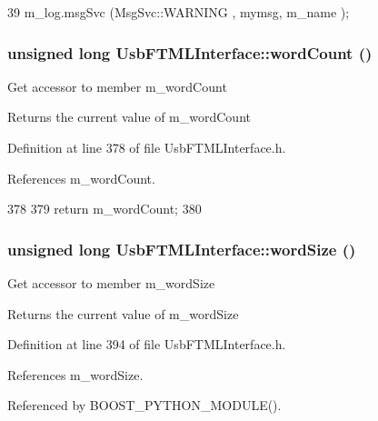 \begin{DoxyCode}
39 { m_log.msgSvc (MsgSvc::WARNING , mymsg, m_name ); }
\end{DoxyCode}
\hypertarget{classUsbFTMLInterface_a844ab72bfe0d3e14dd16f607a7c14905}{
\subsubsection[{wordCount}]{\setlength{\rightskip}{0pt plus 5cm}unsigned long UsbFTMLInterface::wordCount ()}}
\label{classUsbFTMLInterface_a844ab72bfe0d3e14dd16f607a7c14905}
Get accessor to member m\_\-wordCount \begin{DoxyReturn}{Returns}
the current value of m\_\-wordCount 
\end{DoxyReturn}


Definition at line 378 of file UsbFTMLInterface.h.

References m\_\-wordCount.


\begin{DoxyCode}
378                              {
379     return m_wordCount;
380   }
\end{DoxyCode}
\hypertarget{classUsbFTMLInterface_ac313f412cbda6222ef817cb46083e2b3}{
\subsubsection[{wordSize}]{\setlength{\rightskip}{0pt plus 5cm}unsigned long UsbFTMLInterface::wordSize ()}}
\label{classUsbFTMLInterface_ac313f412cbda6222ef817cb46083e2b3}
Get accessor to member m\_\-wordSize \begin{DoxyReturn}{Returns}
the current value of m\_\-wordSize 
\end{DoxyReturn}


Definition at line 394 of file UsbFTMLInterface.h.

References m\_\-wordSize.

Referenced by BOOST\_\-PYTHON\_\-MODULE().


